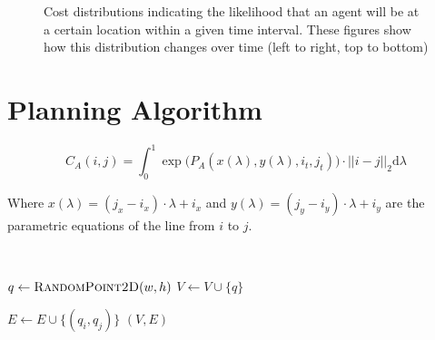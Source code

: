 \begin{figure}[h!]
    \caption{Cost distributions indicating the likelihood that an agent will be
    at a certain location within a given time interval.  These figures show how
this distribution changes over time (left to right, top to bottom)}

    \label{fig:agent_cost}

\end{figure}

\section{Planning Algorithm}


\begin{equation}
    C_A(i, j) = \int^1_0 \exp{\Big(
        P_A(x(\lambda), y(\lambda), i_t, j_t) \Big)
    } \cdot ||i - j||_{2} \mathrm{d}\lambda
    \label{eq:cost}
\end{equation}

Where $x(\lambda) = (j_x - i_x) \cdot \lambda + i_x$ and $y(\lambda) = (j_y -
i_y) \cdot \lambda + i_y$ are the parametric equations of the line from $i$ to
$j$.


\begin{algorithm}[ht]
    \caption{$\Function{Roadmap}(n, d, w, h, O)$}
    \\
    \label{algo:prm}
    \begin{algorithmic}[1]
        \setcounter{ALC@line}{0}
        \vspace*{1mm}

            \STATE $q \leftarrow \Function{RandomPoint2D}(w, h)$
                \STATE $V \leftarrow V \cup \{q\}$
            \ENDIF
        \ENDFOR

                    \STATE $E \leftarrow E \cup \{(q_i, q_j)\}$
                \ENDIF
            \ENDFOR
        \ENDFOR
        \RETURN $(V,E)$
    \end{algorithmic}
\end{algorithm}

